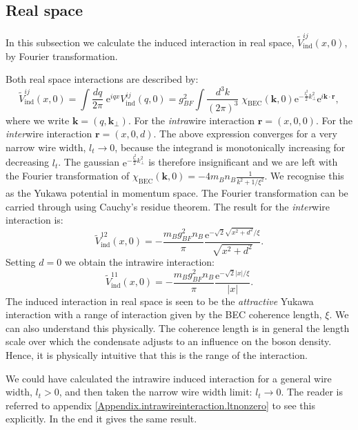 \subsection{Real space}
\label{subsec.inducedinteraction.realspace}
In this subsection we calculate the induced interaction in real space, $\tilde{V}^{ij}_{\text{ind}}(x, 0)$, by Fourier transformation. 

Both real space interactions are described by: 
\begin{equation}
\tilde{V}^{ij}_{\text{ind}}(x, 0) = \int \frac{dq}{2\pi} \; \text{e}^{iqx} V^{ij}_{\text{ind}}(q, 0) = g^2_{BF}\int \frac{d^3 k}{(2\pi)^3}\;\chi_\text{BEC}(\mathbf{k}, 0)\text{e}^{-\frac{l_t^2}{2}k_\perp^2}\text{e}^{i\mathbf{k}\cdot \mathbf{r}}, \nonumber
\end{equation}
where we write $\mathbf{k} = (q, \mathbf{k}_{\perp})$. For the \textit{intra}wire interaction $\mathbf{r} = (x, 0, 0)$. For the \textit{inter}wire interaction $\mathbf{r} = (x, 0, d)$. The above expression converges for a very narrow wire width, $l_t \to 0$, because the integrand is monotonically increasing for decreasing $l_t$. The gaussian $\text{e}^{-\frac{l_t^2}{2}k_\perp^2}$ is therefore insignificant and we are left with the Fourier transformation of $\chi_\text{BEC}(\mathbf{k}, 0) = -4m_Bn_B\frac{1}{k^2 + 1/\xi^2}$. We recognise this as the Yukawa potential in momentum space. The Fourier transformation can be carried through using Cauchy's residue theorem. The result for the \textit{inter}wire interaction is:
\begin{equation}
\tilde{V}^{12}_{\text{ind}}(x, 0) = -\frac{m_Bg_{BF}^2n_B}{\pi}\frac{\text{e}^{ -\sqrt{2}\sqrt{x^2 + d^2}/\xi }}{\sqrt{x^2 + d^2}}.
\label{eq.V12indx}
\end{equation}
Setting $d = 0$ we obtain the intrawire interaction:
\begin{equation}
\tilde{V}^{11}_{\text{ind}}(x, 0) = -\frac{m_Bg_{BF}^2n_B}{\pi}\frac{\text{e}^{ -\sqrt{2}|x|/\xi }}{|x|}.
\label{eq.V11indx}
\end{equation}
The induced interaction in real space is seen to be the \textit{attractive} Yukawa interaction with a range of interaction given by the BEC coherence length, $\xi$. We can also understand this physically. The coherence length is in general the length scale over which the condensate adjusts to an influence on the boson density. Hence, it is physically intuitive that this is the range of the interaction.  

We could have calculated the intrawire induced interaction for a general wire width, $l_t > 0$, and then taken the narrow wire width limit: $l_t \to 0$. The reader is referred to appendix \ref{Appendix.intrawireinteraction.ltnonzero} to see this explicitly. In the end it gives the same result. 

